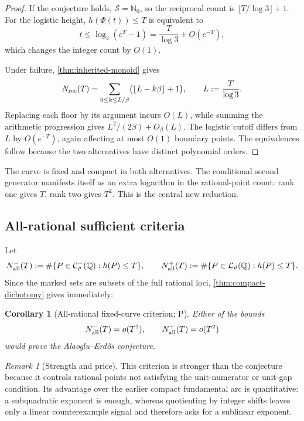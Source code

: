 \documentclass[10pt,oneside]{article}
\newtheorem{corollary}[theorem]{Corollary}
\theoremstyle{definition}
\theoremstyle{remark}
\newtheorem{remark}[theorem]{Remark}
\newcommand{\Nzero}{\mathbb N_0}
\newcommand{\Q}{\mathbb Q}
\newcommand{\Sol}{\mathcal S}
\newcommand{\thetaq}{\vartheta}
\newcommand{\rec}{\mathcal C^-_{\thetaq}}
\newcommand{\logcurve}{\mathcal L_{\thetaq}}
\newcommand{\statusP}{\textsc{P}}
\begin{document}
\begin{proof}
If the conjecture holds, \(\Sol=\Nzero\), so the reciprocal count is
\(
\lfloor T/\log3\rfloor+1.
\)
For the logistic height, \(h(\Phi(t))\le T\) is equivalent to
\[
 t\le \log_3(e^T-1)
 =\frac{T}{\log3}+O(e^{-T}),
\]
which changes the integer count by \(O(1)\).

Under failure, \cref{thm:inherited-monoid} gives
\[
 N_{\rm rec}(T)=
 \sum_{0\le k\le L/\beta}
 \bigl(\lfloor L-k\beta\rfloor+1\bigr),
 \qquad L:=\frac{T}{\log3}.
\]
Replacing each floor by its argument incurs \(O(L)\), while summing the arithmetic progression gives \(L^2/(2\beta)+O_\beta(L)\).  The logistic cutoff differs from \(L\) by \(O(e^{-T})\), again affecting at most \(O(1)\) boundary points.  The equivalences follow because the two alternatives have distinct polynomial orders.
\end{proof}

\begin{provedbox}
The curve is fixed and compact in both alternatives.  The conditional second generator manifests itself as an extra logarithm in the rational-point count: rank one gives \(T\), rank two gives \(T^2\).  This is the central new reduction.
\end{provedbox}

\subsection{All-rational sufficient criteria}
Let
\[
 N_{\rm all}^{-}(T):=
 \#\{P\in\rec(\Q):h(P)\le T\},
\qquad
 N_{\rm all}^{+}(T):=
 \#\{P\in\logcurve(\Q):h(P)\le T\}.
\]
Since the marked sets are subsets of the full rational loci, \cref{thm:compact-dichotomy} gives immediately:

\begin{corollary}[All-rational fixed-curve criterion; \statusP]
\label{cor:all-rational-criterion}
Either of the bounds
\[
 N_{\rm all}^{-}(T)=o(T^2),
 \qquad
 N_{\rm all}^{+}(T)=o(T^2)
\]
would prove the Alaoglu--Erd\H{o}s conjecture.
\end{corollary}

\begin{remark}[Strength and price]
This criterion is stronger than the conjecture because it controls rational points not satisfying the unit-numerator or unit-gap condition.  Its advantage over the earlier compact fundamental arc is quantitative: a subquadratic exponent is enough, whereas quotienting by integer shifts leaves only a linear counterexample signal and therefore asks for a sublinear exponent.
\end{remark}
\end{document}
